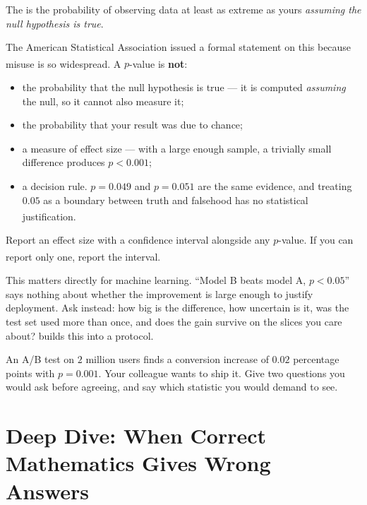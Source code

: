 The  is the probability of observing data at least as
extreme as yours \emph{assuming the null hypothesis is true}.

\begin{cautionbox}
The American Statistical Association issued a formal statement on this because
misuse is so widespread\textsuperscript{\cite{wassersteinASAStatementPvalues2016}}.
A $p$-value is \textbf{not}:
\begin{itemize}
  \item the probability that the null hypothesis is true --- it is computed
        \emph{assuming} the null, so it cannot also measure it;
  \item the probability that your result was due to chance;
  \item a measure of effect size --- with a large enough sample, a trivially
        small difference produces $p<0.001$;
  \item a decision rule. $p = 0.049$ and $p = 0.051$ are the same evidence, and
        treating $0.05$ as a boundary between truth and falsehood has no
        statistical justification\textsuperscript{\cite{amrheinScientistsRiseUp2019}}.
\end{itemize}
Report an effect size with a confidence interval alongside any $p$-value. If
you can report only one, report the
interval\textsuperscript{\cite{reinhartStatisticsDoneWrong2015}}.
\end{cautionbox}

\begin{engineernote}
This matters directly for machine learning. ``Model B beats model A,
$p<0.05$'' says nothing about whether the improvement is large enough to
justify deployment. Ask instead: how big is the difference, how uncertain is
it, was the test set used more than once, and does the gain survive on the
slices you care about?  builds this into a protocol.
\end{engineernote}

\begin{checkpoint}
An A/B test on $2$ million users finds a conversion increase of $0.02$
percentage points with $p = 0.001$. Your colleague wants to ship it. Give two
questions you would ask before agreeing, and say which statistic you would
demand to see.
\end{checkpoint}

\section{Deep Dive: When Correct Mathematics Gives Wrong Answers}
\label{sec:math-numerics}

